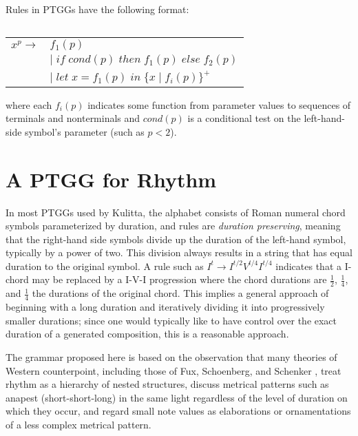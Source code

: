 \documentclass{article}
\begin{document}
Rules in PTGGs have the following format:

$\;$ \\
\begin{tabular}{ll}
$x^p \rightarrow$ & $f_{1}(p)$ \\
$\;$ & $ \vert \;  if \; cond(p) \; then \; f_{1}(p) \; else \; f_{2}(p)$ \\
$\;$ & $\vert \; let \; x = f_{1}(p) \; in \; \{x \; | \; f_{i}(p)\}^{+}$ \\
\end{tabular} $\;$ \\

\noindent where each $f_{i}(p)$ indicates some function from parameter values to sequences of terminals and nonterminals and $cond(p)$ is a conditional test on the left-hand-side symbol's parameter (such as $p<2$).


\section{A PTGG for Rhythm}


In most PTGGs used by Kulitta, the alphabet consists of Roman numeral chord symbols parameterized by duration, and rules are \emph{duration preserving}, meaning that the right-hand side symbols divide up the duration of the left-hand symbol, typically by a power of two. This division always results in a string that has equal duration to the original symbol. A rule such as $I^{t} \rightarrow I^{t/2} V^{t/4} I^{t/4}$ indicates that a I-chord may be replaced by a I-V-I progression where the chord durations are $\frac{1}{2}$, $\frac{1}{4}$, and $\frac{1}{4}$ the durations of the original chord. This implies a general approach of beginning with a long duration and iteratively dividing it into progressively smaller durations; since one would typically like to have control over the exact duration of a generated composition, this is a reasonable approach.

The grammar proposed here is based on the observation that many theories of Western counterpoint, including those of Fux, Schoenberg, and Schenker \cite{[TO-DO]}, treat rhythm as a hierarchy of nested structures, discuss metrical patterns such as anapest (short-short-long) in the same light regardless of the level of duration on which they occur, and regard small note values as elaborations or ornamentations of a less complex metrical pattern.
\end{document}
